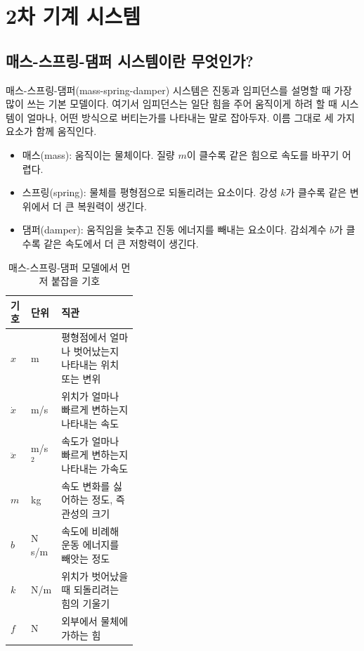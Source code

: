 \section{2차 기계 시스템}

\subsection{매스-스프링-댐퍼 시스템이란 무엇인가?}

매스-스프링-댐퍼(mass-spring-damper) 시스템은 진동과 임피던스를 설명할 때 가장 많이 쓰는 기본 모델이다.
여기서 임피던스는 일단 힘을 주어 움직이게 하려 할 때 시스템이 얼마나, 어떤 방식으로 버티는가를 나타내는 말로 잡아두자.
이름 그대로 세 가지 요소가 함께 움직인다.

\begin{itemize}
  \item 매스(mass): 움직이는 물체이다. 질량 $m$이 클수록 같은 힘으로 속도를 바꾸기 어렵다.
  \item 스프링(spring): 물체를 평형점으로 되돌리려는 요소이다. 강성 $k$가 클수록 같은 변위에서 더 큰 복원력이 생긴다.
  \item 댐퍼(damper): 움직임을 늦추고 진동 에너지를 빼내는 요소이다. 감쇠계수 $b$가 클수록 같은 속도에서 더 큰 저항력이 생긴다.
\end{itemize}

\begin{table}[!htbp]
  \centering
  \caption{매스-스프링-댐퍼 모델에서 먼저 붙잡을 기호}
  \small
  \setlength{\tabcolsep}{4pt}
  \begin{tabularx}{\linewidth}{@{}>{\raggedright\arraybackslash}p{0.16\linewidth}>{\raggedright\arraybackslash}p{0.20\linewidth}>{\raggedright\arraybackslash}X@{}}
    \toprule
    기호 & 단위 & 직관 \\
    \midrule
    $x$ & m & 평형점에서 얼마나 벗어났는지 나타내는 위치 또는 변위 \\
    $\dot{x}$ & m/s & 위치가 얼마나 빠르게 변하는지 나타내는 속도 \\
    $\ddot{x}$ & m/s$^2$ & 속도가 얼마나 빠르게 변하는지 나타내는 가속도 \\
    $m$ & kg & 속도 변화를 싫어하는 정도, 즉 관성의 크기 \\
    $b$ & N\,s/m & 속도에 비례해 운동 에너지를 빼앗는 정도 \\
    $k$ & N/m & 위치가 벗어났을 때 되돌리려는 힘의 기울기 \\
    $f$ & N & 외부에서 물체에 가하는 힘 \\
    \bottomrule
  \end{tabularx}
\end{table}

